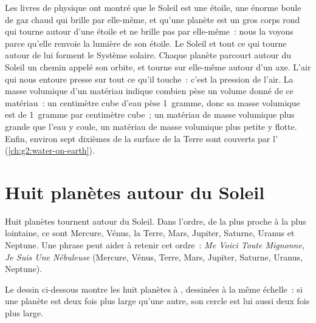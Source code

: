 \begin{recall}
Les livres de physique ont montré que le Soleil est une étoile, une énorme
boule de gaz chaud qui brille par elle-même, et qu'une planète est un gros
corps rond qui tourne autour d'une étoile et ne brille pas par
elle-même~: nous la voyons parce qu'elle renvoie la lumière de son étoile.
Le Soleil et tout ce qui tourne autour de lui forment le Système solaire.
Chaque planète parcourt autour du Soleil un chemin appelé son orbite, et
tourne sur elle-même autour d'un axe. L'air qui nous entoure presse sur
tout ce qu'il touche~: c'est la pression de l'air. La masse volumique d'un
matériau indique combien pèse un volume donné de ce matériau~: un
centimètre cube d'eau pèse 1~gramme, donc sa masse volumique est de
1~gramme par centimètre cube~; un matériau de masse volumique plus grande
que l'eau y coule, un matériau de masse volumique plus petite y flotte.
Enfin, environ sept dixièmes de la surface de la Terre sont couverts par
l' (\cref{ch:g2:water-on-earth}).
\end{recall}

\section{Huit planètes autour du Soleil}

Huit planètes tournent autour du Soleil. Dans l'ordre, de la plus proche à
la plus lointaine, ce sont Mercure, Vénus, la Terre, Mars, Jupiter,
Saturne, Uranus et Neptune. Une phrase peut aider à retenir cet ordre~:
\emph{Me Voici Toute Mignonne, Je Suis Une Nébuleuse} (Mercure, Vénus,
Terre, Mars, Jupiter, Saturne, Uranus, Neptune).

Le dessin ci-dessous montre les huit planètes  à , dessinées à la
même échelle~: si une planète est deux fois plus large qu'une autre, son
cercle est lui aussi deux fois plus large.

